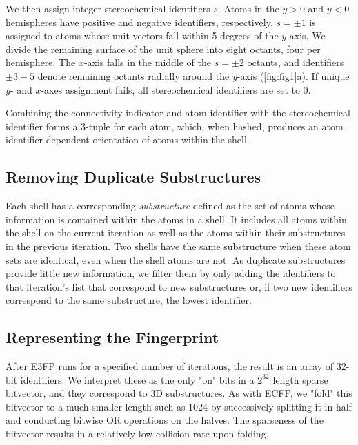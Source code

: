 \documentclass[../../main.tex]{subfiles}
\begin{document}
\begin{refsection}
	We then assign integer stereochemical identifiers $s$.
	Atoms in the  $y > 0$ and $y < 0$ hemispheres have positive and negative identifiers, respectively.
	$s = \pm 1$ is assigned to atoms whose unit vectors fall within 5 degrees of the $y$-axis.
	We divide the remaining surface of the unit sphere into eight octants, four per hemisphere.
	The $x$-axis falls in the middle of the  $s = \pm 2$ octants, and identifiers $\pm 3-5$ denote remaining octants radially around the $y$-axis (\cref{fig:fig1}a).
	If unique $y$- and  $x$-axes assignment fails, all stereochemical identifiers are set to 0.

	Combining the connectivity indicator and atom identifier with the stereochemical identifier forms a 3-tuple for each atom, which, when hashed, produces an atom identifier dependent orientation of atoms within the shell.

	\subsection*{Removing Duplicate Substructures}

	Each shell has a corresponding \emph{substructure} defined as the set of atoms whose information is contained within the atoms in a shell.
	It includes all atoms within the shell on the current iteration as well as the atoms within their substructures in the previous iteration.
	Two shells have the same substructure when these atom sets are identical, even when the shell atoms are not.
	As duplicate substructures provide little new information, we filter them by only adding the identifiers to that iteration's list that correspond to new substructures or, if two new identifiers correspond to the same substructure, the lowest identifier.

	\subsection*{Representing the Fingerprint}

	After E3FP runs for a specified number of iterations, the result is an array of 32-bit identifiers.
	We interpret these as the only "on" bits in a $2^{32}$ length sparse bitvector, and they correspond to 3D substructures.
	As with ECFP, we "fold" this bitvector to a much smaller length such as 1024 by successively splitting it in half and conducting bitwise OR operations on the halves.
	The sparseness of the bitvector results in a relatively low collision rate upon folding.


\end{refsection}
\end{document}
